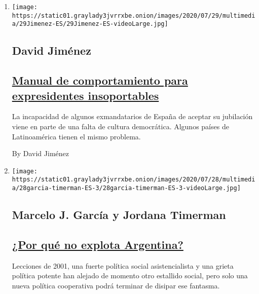 \begin{enumerate}
\def\labelenumi{\arabic{enumi}.}
\item
  \texttt{[image: https://static01.graylady3jvrrxbe.onion/images/2020/07/29/multimedia/29Jimenez-ES/29Jimenez-ES-videoLarge.jpg]}

  \hypertarget{david-jimuxe9nez}{%
  \subsection{David Jiménez}\label{david-jimuxe9nez}}

  \hypertarget{manual-de-comportamiento-para-expresidentes-insoportables}{%
  \subsection{\texorpdfstring{\href{/es/2020/07/29/espanol/opinion/espana-felipe-gonzalez-jose-maria-aznar.html}{Manual
  de comportamiento para expresidentes
  insoportables}}{Manual de comportamiento para expresidentes insoportables}}\label{manual-de-comportamiento-para-expresidentes-insoportables}}

  La incapacidad de algunos exmandatarios de España de aceptar su
  jubilación viene en parte de una falta de cultura democrática. Algunos
  países de Latinoamérica tienen el mismo problema.

  By David Jiménez
\item
  \texttt{[image: https://static01.graylady3jvrrxbe.onion/images/2020/07/28/multimedia/28garcia-timerman-ES-3/28garcia-timerman-ES-3-videoLarge.jpg]}

  \hypertarget{marcelo-j-garcuxeda-y-jordana-timerman}{%
  \subsection{Marcelo J. García y Jordana
  Timerman}\label{marcelo-j-garcuxeda-y-jordana-timerman}}

  \hypertarget{por-quuxe9-no-explota-argentina}{%
  \subsection{\texorpdfstring{\href{/es/2020/07/28/espanol/opinion/argentina-estallido-2001-coronavirus.html}{¿Por
  qué no explota
  Argentina?}}{¿Por qué no explota Argentina?}}\label{por-quuxe9-no-explota-argentina}}

  Lecciones de 2001, una fuerte política social asistencialista y una
  grieta política potente han alejado de momento otro estallido social,
  pero solo una nueva política cooperativa podrá terminar de disipar ese
  fantasma.


\end{enumerate}
